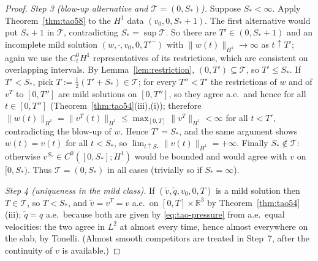 \documentclass[11pt]{article}
\theoremstyle{definition}
\theoremstyle{plain}
\newcommand{\R}{\mathbb R}
\newcommand{\norm}[1]{\lVert #1\rVert}
\begin{document}
\begin{proof}
\emph{Step 3 (blow-up alternative and $\mathcal T=(0,S_*)$).}  Suppose
$S_*<\infty$.  Apply Theorem~\ref{thm:tao58} to the $H^1$ data
$(v_0,0,S_*+1)$.  The first alternative would put $S_*+1$ in
$\mathcal T$, contradicting $S_*=\sup\mathcal T$.  So there are
$T'\in(0,S_*+1)$ and an incomplete mild solution $(w,\cdot,v_0,0,T'^-)$
with $\norm{w(t)}_{H^1}\to\infty$ as $t\uparrow T'$; again we use the
$C^0_tH^1$ representatives of its restrictions, which are consistent on
overlapping intervals.  By Lemma~\ref{lem:restriction},
$(0,T')\subseteq\mathcal T$, so $T'\leq S_*$.  If $T'<S_*$, pick
$T:=\frac12(T'+S_*)\in\mathcal T$; for every $T''<T'$ the restrictions of
$w$ and of $v^T$ to $[0,T'']$ are mild solutions on $[0,T'']$, so they
agree a.e.\ and hence for all $t\in[0,T'']$ (Theorem~\ref{thm:tao54}(iii),(i));
therefore $\norm{w(t)}_{H^1}=\norm{v^T(t)}_{H^1}\leq
\max_{[0,T]}\norm{v^T}_{H^1}<\infty$ for all $t<T'$, contradicting the
blow-up of $w$.  Hence $T'=S_*$, and the same argument shows $w(t)=v(t)$
for all $t<S_*$, so $\lim_{t\uparrow S_*}\norm{v(t)}_{H^1}=+\infty$.
Finally $S_*\notin\mathcal T$: otherwise $v^{S_*}\in C^0([0,S_*];H^1)$
would be bounded and would agree with $v$ on $[0,S_*)$.  Thus
$\mathcal T=(0,S_*)$ in all cases (trivially so if $S_*=\infty$).

\emph{Step 4 (uniqueness in the mild class).}  If $(\tilde v,\tilde q,
v_0,0,T)$ is a mild solution then $T\in\mathcal T$, so $T<S_*$, and
$\tilde v=v^T=v$ a.e.\ on $[0,T]\times\R^3$ by Theorem~\ref{thm:tao54}(iii);
$\tilde q=q$ a.e.\ because both are given by \eqref{eq:tao-pressure} from
a.e.\ equal velocities: the two agree in $L^2$ at almost every time, hence
almost everywhere on the slab, by Tonelli.  (Almost smooth competitors are treated in
Step~7, after the continuity of $v$ is available.)


\end{proof}
\end{document}
